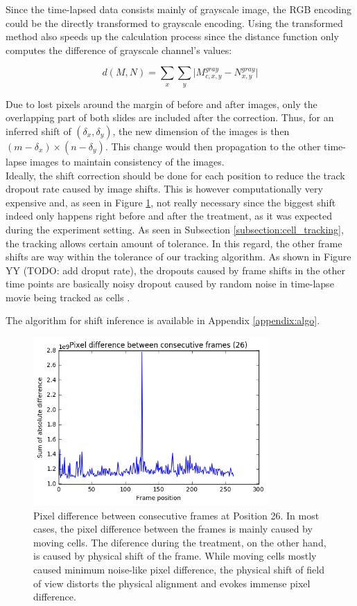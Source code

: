 \documentclass[pdftex,12pt,a4paper]{report}
\begin{document}
Since the time-lapsed data consists mainly of grayscale image, the RGB encoding could be the directly transformed to grayscale encoding. Using the transformed method also speeds up the calculation process since the distance function only computes the difference of grayscale channel's values:

$$
d(M, N) =  \sum_{x} \sum_{y} \vert M_{c, x, y}^{gray} - N_{x, y}^{gray}\vert
$$

Due to lost pixels around the margin of before and after images, only the overlapping part of both slides are included after the correction. Thus, for an inferred shift of $(\delta_x, \delta_y)$, the new dimension of the images is then $(m - \delta_x) \times (n - \delta_y)$. This change would then propagation to the other time-lapse images to maintain consistency of the images.\\

Ideally, the shift correction should be done for each position to reduce the track dropout rate caused by image shifts. This is however computationally very expensive and, as seen in Figure \ref{fig:pixdiff}, not really necessary since the biggest shift indeed only happens right before and after the treatment, as it was expected during the experiment setting. As seen in Subsection \ref{subsection:cell_tracking}, the tracking allows certain amount of tolerance. In this regard, the other frame shifts are way within the tolerance of our tracking algorithm. As shown in Figure YY (TODO: add droput rate), the dropouts caused by frame shifts in the other time points are basically noisy dropout caused by random noise in time-lapse movie being tracked as cells \cite{jaqaman2008robust}.

The algorithm for shift inference is available in Appendix \ref{appendix:algo}.

\begin{figure}[H]
\centering
\includegraphics[width=0.8\textwidth]{images/pixdiff}
\caption{Pixel difference between consecutive frames at Position 26. In most cases, the pixel difference between the frames is mainly caused by moving cells. The diference during the treatment, on the other hand, is caused by physical shift of the frame. While moving cells mostly caused minimum noise-like pixel difference, the physical shift of field of view distorts the physical alignment and evokes immense pixel difference.}
\label{fig:pixdiff}
\end{figure}
\end{document}
